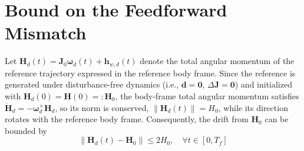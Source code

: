 \documentclass[journal]{new-aiaa}
\begin{document}
\section{Bound on the Feedforward Mismatch}
\label{app:Deltaf_bound}
Let $\boldsymbol{H}_d(t) = \boldsymbol{J}_0\boldsymbol{\omega}_d(t) + \boldsymbol{h}_{w,d}(t)$ denote the total angular momentum of the reference trajectory expressed in the reference body frame.
Since the reference is generated under disturbance-free dynamics (i.e., $\boldsymbol{d}=\boldsymbol{0}$, $\Delta\boldsymbol{J}=\boldsymbol{0}$) and initialized with $\boldsymbol{H}_d(0) = \boldsymbol{H}(0) =: \boldsymbol{H}_0$,
the body-frame total angular momentum satisfies $\dot{\boldsymbol{H}}_d=-\boldsymbol{\omega}_d^{\times}\boldsymbol{H}_d$,
so its norm is conserved, $\|\boldsymbol{H}_d(t)\|=H_0$, while its direction rotates with the reference body frame.
Consequently, the drift from $\boldsymbol{H}_0$ can be bounded by
\[
\|\boldsymbol{H}_d(t)-\boldsymbol{H}_0\|\le 2H_0,\quad \forall t\in[0,T_f]
\]
\end{document}
